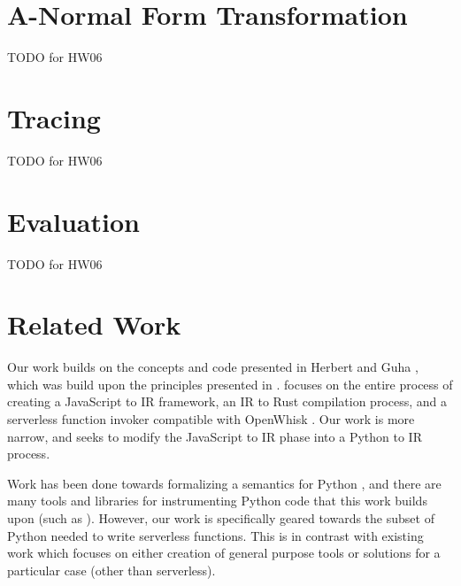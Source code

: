 \documentclass[acmsmall,review,authorversion]{acmart}
\begin{document}
\section{A-Normal Form Transformation}

TODO for HW06


\section{Tracing}

TODO for HW06

\section{Evaluation}

TODO for HW06

\section{Related Work}

Our work builds on the concepts and code presented in Herbert and Guha \cite{ServerlessAccel}, which was build upon the principles presented in \cite{FormalFoundations}. \cite{ServerlessAccel} focuses on the entire process of creating a JavaScript to IR framework, an IR to Rust compilation process, and a serverless function invoker compatible with OpenWhisk \cite{OpenWhisk}. Our work is more narrow, and seeks to modify the JavaScript to IR phase into a Python to IR process.


Work has been done towards formalizing a semantics for Python \cite{pyOpSem}, and there are many tools and libraries for instrumenting Python code that this work builds upon (such as \cite{rpython}). However, our work is specifically geared towards the subset of Python needed to write serverless functions. This is in contrast with existing work which focuses on either creation of general purpose tools or solutions for a particular case (other than serverless).
\end{document}
